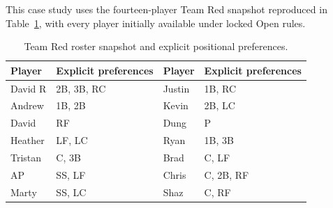 \documentclass[11pt]{article}
\begin{document}
This case study uses the fourteen-player Team Red snapshot reproduced in
Table~\ref{tab:team-red-roster}, with every player initially available under
locked Open rules.

\begin{table}[htbp]
\centering
\caption{Team Red roster snapshot and explicit positional preferences.}
\label{tab:team-red-roster}
\begin{tabular}{ll@{\qquad}ll}
\toprule
Player & Explicit preferences & Player & Explicit preferences\\
\midrule
David R & 2B, 3B, RC & Justin & 1B, RC\\
Andrew & 1B, 2B & Kevin & 2B, LC\\
David & RF & Dung & P\\
Heather & LF, LC & Ryan & 1B, 3B\\
Tristan & C, 3B & Brad & C, LF\\
AP & SS, LF & Chris & C, 2B, RF\\
Marty & SS, LC & Shaz & C, RF\\
\bottomrule
\end{tabular}
\end{table}

\begin{table}[H]
\centering
\caption{Representative Team Red defensive schedule.}
\label{tab:team-red-lineup}
\scriptsize
{}
\end{table}
\end{document}
